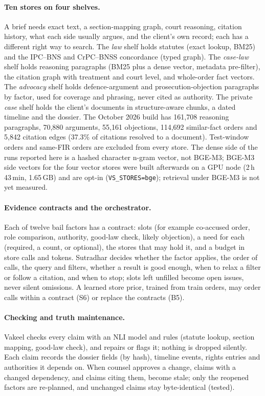 \paragraph{Ten stores on four shelves.} A brief needs exact text, a section-mapping graph, court reasoning, citation history, what each side usually argues, and the client's own record; each has a different right way to search. The \emph{law} shelf holds statutes (exact lookup, BM25) and the IPC--BNS and CrPC--BNSS concordance (typed graph). The \emph{case-law} shelf holds reasoning paragraphs (BM25 plus a dense vector, metadata pre-filter), the citation graph with treatment and court level, and whole-order fact vectors. The \emph{advocacy} shelf holds defence-argument and prosecution-objection paragraphs by factor, used for coverage and phrasing, never cited as authority. The private \emph{case} shelf holds the client's documents in structure-aware chunks, a dated timeline and the dossier. The October 2026 build has 161,708 reasoning paragraphs, 70,880 arguments, 55,161 objections, 114,692 similar-fact orders and 5,842 citation edges (37.3\% of citations resolved to a document). Test-window orders and same-FIR orders are excluded from every store. The dense side of the runs reported here is a hashed character n-gram vector, not BGE-M3; BGE-M3 side vectors for the four vector stores were built afterwards on a GPU node (2\,h\,43\,min, 1.65\,GB) and are opt-in (\texttt{VS\_STORES=bge}); retrieval under BGE-M3 is not yet measured.

\paragraph{Evidence contracts and the orchestrator.} Each of twelve bail factors has a contract: slots (for example co-accused order, role comparison, authority, good-law check, likely objection), a need for each (required, a count, or optional), the stores that may hold it, and a budget in store calls and tokens. Sutradhar decides whether the factor applies, the order of calls, the query and filters, whether a result is good enough, when to relax a filter or follow a citation, and when to stop; slots left unfilled become open issues, never silent omissions. A learned store prior, trained from train orders, may order calls within a contract (S6) or replace the contracts (B5).

\paragraph{Checking and truth maintenance.} Vakeel checks every claim with an NLI model and rules (statute lookup, section mapping, good-law check), and repairs or flags it; nothing is dropped silently. Each claim records the dossier fields (by hash), timeline events, rights entries and authorities it depends on. When counsel approves a change, claims with a changed dependency, and claims citing them, become stale; only the reopened factors are re-planned, and unchanged claims stay byte-identical (tested).

